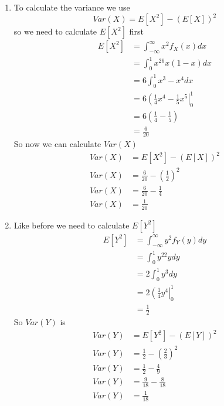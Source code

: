 \documentclass[11pt]{article}
\begin{document}
\begin{enumerate}
\begin{enumerate}
\item
To calculate the variance we use
$$Var(X) = E[X^2] - (E[X])^2$$
so we need to calculate $E[X^2]$ first
\begin{align*}
E[X^2] &=  \int_{-\infty}^{\infty}x^2f_X(x)dx\\
&= \int_0^1 x^26x(1-x)dx\\
&= 6\int_0^1 x^3-x^4dx\\
&= 6\left(\frac{1}{4}x^4-\frac{1}{5}x^5\right|_0^1\\
&= 6\left(\frac{1}{4}-\frac{1}{5}\right)\\
&= \frac{6}{20}
\end{align*}
So now we can calculate $Var(X)$
\begin{align*}
Var(X) &= E[X^2] - (E[X])^2\\
Var(X) &= \frac{6}{20} - \left(\frac{1}{2}\right)^2\\
Var(X) &= \frac{6}{20} - \frac{1}{4}\\
Var(X) &= \frac{1}{20}
\end{align*}

\item
Like before we need to calculate $E[Y^2]$
\begin{align*}
E[Y^2] &= \int_{-\infty}^{\infty}y^2f_Y(y)dy\\
&= \int_0^1 y^22ydy\\
&= 2\int_0^1 y^3dy\\
&= 2\left(\frac{1}{4}y^4\right|_0^1\\
&= \frac{1}{2}
\end{align*}
So $Var(Y)$ is
\begin{align*}
Var(Y) &= E[Y^2] - (E[Y])^2\\
Var(Y) &= \frac{1}{2} - \left(\frac{2}{3}\right)^2\\
Var(Y) &= \frac{1}{2} - \frac{4}{9}\\
Var(Y) &= \frac{9}{18} - \frac{8}{18}\\
Var(Y) &= \frac{1}{18} 
\end{align*}
\end{enumerate}


\end{enumerate}
\end{document}

